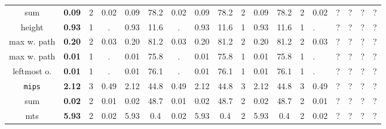 \begin{table}
{\begin{tabular}[h]{|c| c|c|c|| c|c|c || c|c|c|| c|c|c|}
			\hline
			sum                        & {\bf 0.09}                  & 2                                         & 0.02                                       & 0.09                                     & 78.2 & 0.02       & 0.09   & 78.2 & 2          & 0.09   & 78.2 & 2 & 0.02  & ? & ? & ? & ? \\
			height                     & {\bf 0.93}                  & 1                                         & .                                          & 0.93                                     & 11.6 & .          & 0.93   & 11.6 & 1          & 0.93   & 11.6 & 1 & .     & ? & ? & ? & ? \\
			max w. path                & {\bf 0.20}                  & 2                                         & 0.03                                       & 0.20                                     & 81.2 & 0.03       & 0.20   & 81.2 & 2          & 0.20   & 81.2 & 2 & 0.03  & ? & ? & ? & ? \\
			max w. path                & {\bf 0.01}                  & 1                                         & .                                          & 0.01                                     & 75.8 & .          & 0.01   & 75.8 & 1          & 0.01   & 75.8 & 1 & .     & ? & ? & ? & ? \\
			leftmost o.                & {\bf 0.01}                  & 1                                         & .                                          & 0.01                                     & 76.1 & .          & 0.01   & 76.1 & 1          & 0.01   & 76.1 & 1 & .     & ? & ? & ? & ? \\
			{\tt mips}                 & {\bf 2.12}                  & 3                                         & 0.49                                       & 2.12                                     & 44.8 & 0.49       & 2.12   & 44.8 & 3          & 2.12   & 44.8 & 3 & 0.49  & ? & ? & ? & ? \\
			\hline
			sum                        & {\bf 0.02}                  & 2                                         & 0.01                                       & 0.02                                     & 48.7 & 0.01       & 0.02   & 48.7 & 2          & 0.02   & 48.7 & 2 & 0.01  & ? & ? & ? & ? \\
			mts                        & {\bf 5.93}                  & 2                                         & 0.02                                       & 5.93                                     & 0.4  & 0.02       & 5.93   & 0.4  & 2          & 5.93   & 0.4  & 2 & 0.02  & ? & ? & ? & ? \\

\end{tabular}}
\end{table}
